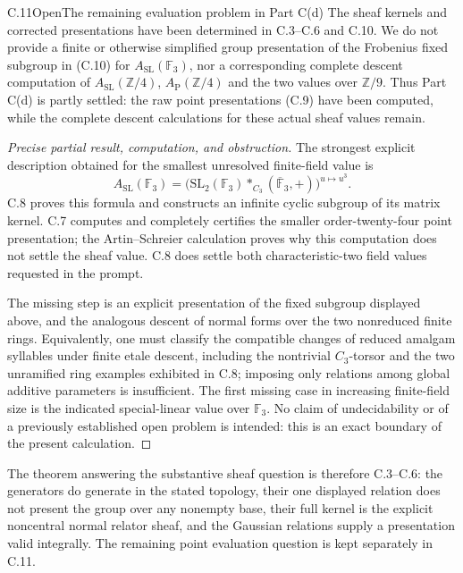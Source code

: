 \begin{statement}{C.11}{Open}{The remaining evaluation problem in Part C(d)}
The sheaf kernels and corrected presentations have been determined
in C.3--C.6 and C.10. We do not provide a finite or otherwise
simplified group presentation of the Frobenius fixed subgroup
in (C.10) for $A_{\mathrm{SL}}(\mathbb F_3)$, nor a corresponding
complete descent computation of $A_{\mathrm{SL}}(\mathbb Z/4)$,
$A_{\mathrm P}(\mathbb Z/4)$ and the two values over
$\mathbb Z/9$. Thus Part C(d) is partly settled: the raw
point presentations (C.9) have been computed, while the
complete descent calculations for these actual sheaf values remain.
\end{statement}
\begin{proof}[Precise partial result, computation, and obstruction]
The strongest explicit description obtained for the smallest
unresolved finite-field value is
\[
 A_{\mathrm{SL}}(\mathbb F_3)=
 \bigl(\mathrm{SL}_2(\mathbb F_3)*_{C_3}
             (\overline{\mathbb F}_3,+)\bigr)^{u\mapsto u^3}.
\]
C.8 proves this formula and constructs an infinite cyclic
subgroup of its matrix kernel. C.7 computes and completely
certifies the smaller order-twenty-four point presentation;
the Artin--Schreier calculation proves why this computation
does not settle the sheaf value. C.8 does settle both
characteristic-two field values requested in the prompt.

The missing step is an explicit presentation of the fixed
subgroup displayed above, and the analogous descent of
normal forms over the two nonreduced finite rings. Equivalently,
one must classify the compatible changes of reduced amalgam
syllables under finite etale descent, including the nontrivial
$C_3$-torsor and the two unramified ring examples exhibited in C.8;
imposing only relations among
global additive parameters is insufficient. The first missing
case in increasing finite-field size is the indicated
special-linear value over $\mathbb F_3$. No claim of
undecidability or of a previously established open problem
is intended: this is an exact boundary of the present calculation.
\end{proof}

The theorem answering the substantive sheaf question is therefore
C.3--C.6: the generators do generate in the stated topology,
their one displayed relation does not present the group over
any nonempty base, their full kernel is the explicit noncentral
normal relator sheaf, and the Gaussian relations supply a
presentation valid integrally. The remaining point evaluation
question is kept separately in C.11.
